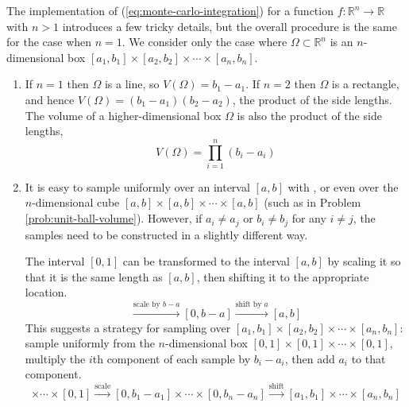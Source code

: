 The implementation of (\ref{eq:monte-carlo-integration}) for a function $f:\mathbb{R}^n\rightarrow\mathbb{R}$ with $n > 1$ introduces a few tricky details, but the overall procedure is the same for the case when $n=1$.
We consider only the case where $\Omega \subset \mathbb{R}^n$ is an $n$-dimensional box $[a_1,b_1]\times[a_2,b_2]\times\cdots\times[a_n,b_n]$.
\begin{enumerate}
\item
If $n=1$ then $\Omega$ is a line, so $V(\Omega) = b_1 - a_1$.
If $n=2$ then $\Omega$ is a rectangle, and hence $V(\Omega) = (b_1 - a_1)(b_2-a_2)$, the product of the side lengths.
The volume of a higher-dimensional box $\Omega$ is also the product of the side lengths,
\begin{equation}
    V(\Omega) = \prod_{i=1}^n (b_i - a_i)
\label{eq:mc-box-volume}
\end{equation}

\item It is easy to sample uniformly over an interval $[a,b]$ with , or even over the $n$-dimensional cube $[a,b]\times[a,b]\times\cdots\times[a,b]$ (such as in Problem \ref{prob:unit-ball-volume}).
However, if $a_i \ne a_j$ or $b_i \ne b_j$ for any $i\ne j$, the samples need to be constructed in a slightly different way.

The interval $[0,1]$ can be transformed to the interval $[a,b]$ by scaling it so that it is the same length as $[a,b]$, then shifting it to the appropriate location.
\begin{equation*}
    [0,1]\xrightarrow{\text{scale by } b-a} [0,b-a] \xrightarrow{\text{shift by } a} [a,b]
\end{equation*}
This suggests a strategy for sampling over $[a_1,b_1]\times[a_2,b_2]\times\cdots\times[a_n,b_n]$: sample uniformly from the $n$-dimensional box $[0, 1]\times[0, 1]\times\cdots\times[0, 1]$, multiply the $i$th component of each sample by $b_i - a_i$, then add $a_i$ to that component.
\begin{equation}
    [0, 1]\times\cdots\times[0, 1]
    \xrightarrow{\text{scale}}
    [0, b_1-a_1]\times\cdots\times[0, b_n-a_n]
    \xrightarrow{\text{shift}}
    [a_1,b_1]\times\cdots\times[a_n,b_n]
\label{eq:mc-domain-transform}
\end{equation}
\end{enumerate}

